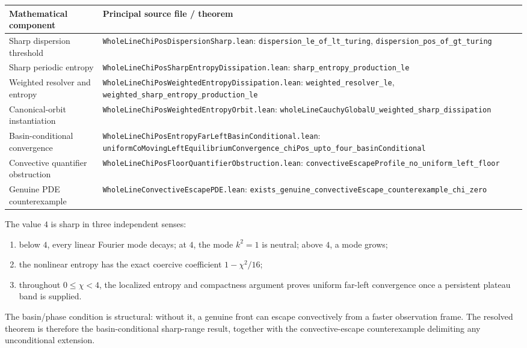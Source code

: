 \documentclass[11pt]{article}
\newcommand{\code}[1]{\nolinkurl{#1}}
\begin{document}
\begin{center}
\small
\renewcommand{\arraystretch}{1.18}
\begin{tabular}{@{}p{}p{}@{}}
\toprule
Mathematical component & Principal source file / theorem\\
\midrule
Sharp dispersion threshold &
\code{WholeLineChiPosDispersionSharp.lean}:
\code{dispersion_le_of_lt_turing},
\code{dispersion_pos_of_gt_turing}\\
Sharp periodic entropy &
\code{WholeLineChiPosSharpEntropyDissipation.lean}:
\code{sharp_entropy_production_le}\\
Weighted resolver and entropy &
\code{WholeLineChiPosWeightedEntropyDissipation.lean}:
\code{weighted_resolver_le},
\code{weighted_sharp_entropy_production_le}\\
Canonical-orbit instantiation &
\code{WholeLineChiPosWeightedEntropyOrbit.lean}:
\code{wholeLineCauchyGlobalU_weighted_sharp_dissipation}\\
Basin-conditional convergence &
\code{WholeLineChiPosEntropyFarLeftBasinConditional.lean}:
\code{uniformCoMovingLeftEquilibriumConvergence_chiPos_upto_four_basinConditional}\\
Convective quantifier obstruction &
\code{WholeLineChiPosFloorQuantifierObstruction.lean}:
\code{convectiveEscapeProfile_no_uniform_left_floor}\\
Genuine PDE counterexample &
\code{WholeLineConvectiveEscapePDE.lean}:
\code{exists_genuine_convectiveEscape_counterexample_chi_zero}\\
\bottomrule
\end{tabular}
\end{center}

\medskip
\noindent The value \(4\) is sharp in three independent senses:
\begin{enumerate}[leftmargin=2em]
\item below \(4\), every linear Fourier mode decays; at \(4\), the mode
  \(k^2=1\) is neutral; above \(4\), a mode grows;
\item the nonlinear entropy has the exact coercive coefficient
  \(1-\chi^2/16\);
\item throughout \(0\le\chi<4\), the localized entropy and compactness
  argument proves uniform far-left convergence once a persistent plateau
  band is supplied.
\end{enumerate}
The basin/phase condition is structural: without it, a genuine front can
escape convectively from a faster observation frame.  The resolved theorem is
therefore the basin-conditional sharp-range result, together with the
convective-escape counterexample delimiting any unconditional extension.
\end{document}
